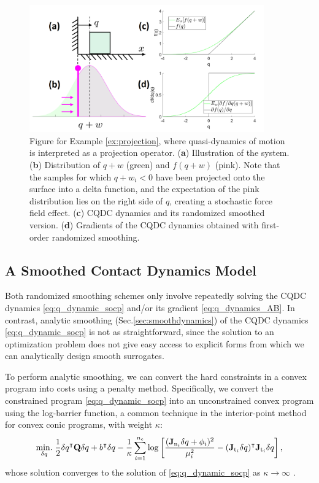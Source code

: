 \begin{example}
\begin{figure}
\centering\includegraphics[width = 0.90\textwidth]{figures/02_quasi_static_dynamics/projection.png}
\caption{Figure for Example \ref{ex:projection}, where quasi-dynamics of motion is interpreted as a projection operator. (\textbf{a}) Illustration of the system. (\textbf{b}) Distribution of $q + w$ (green) and $f(q + w)$ (pink). Note that the samples for which $q+w_i<0$ have been projected onto the surface into a delta function, and the expectation of the pink distribution lies on the right side of $q$, creating a stochastic force field effect. (\textbf{c}) CQDC dynamics and its randomized smoothed version. (\textbf{d}) Gradients of the CQDC dynamics obtained with first-order randomized smoothing.}
\label{fig:projection}
\end{figure}
\end{example}

\subsection{A Smoothed Contact Dynamics Model}\label{sec:analyticsmoothing}
Both randomized smoothing schemes only involve repeatedly solving the CQDC dynamics \eqref{eq:q_dynamic_socp} and/or its gradient \eqref{eq:q_dynamics_AB}. In contrast, analytic smoothing (Sec.\ref{sec:smoothdynamics}) of the CQDC dynamics \eqref{eq:q_dynamic_socp} is not as straightforward, since the solution to an optimization problem does not give easy access to explicit forms from which we can analytically design smooth surrogates.

To perform analytic smoothing,  we can convert the hard constraints in a convex program into costs using a penalty method. Specifically, we convert the constrained program \eqref{eq:q_dynamic_socp} into an unconstrained convex program using the log-barrier function, a common technique in the interior-point method for convex conic programs, with weight $\kappa$:
\begin{equation}
\label{eq:q_dynamics_log}
\underset{\dq}{\minimize} \; \frac{1}{2} \dq^\intercal \mathbf{Q} \dq + b^\intercal \dq - \frac{1}{\kappa} \sum_{i=1}^{\nC} \log \left[\frac{(\Jn[i] \dq + \phi_i)^2}{\mu_i^2} - (\Jt[i]\dq)^\intercal \Jt[i]\dq \right],
\end{equation}
whose solution converges to the solution of \eqref{eq:q_dynamic_socp} as $\kappa \rightarrow \infty$ \cite[ and ]{boyd2004convex}.

